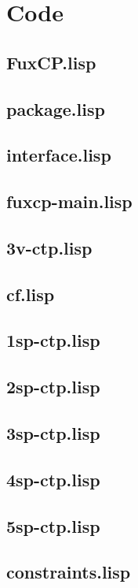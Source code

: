 \chapter{Code}\label{chapter:whole-code}
\section{FuxCP.lisp}

\section{package.lisp}

\section{interface.lisp}

\section{fuxcp-main.lisp}

\section{3v-ctp.lisp}

\section{cf.lisp}

\section{1sp-ctp.lisp}

\section{2sp-ctp.lisp}

\section{3sp-ctp.lisp}

\section{4sp-ctp.lisp}

\section{5sp-ctp.lisp}

\section{constraints.lisp}

